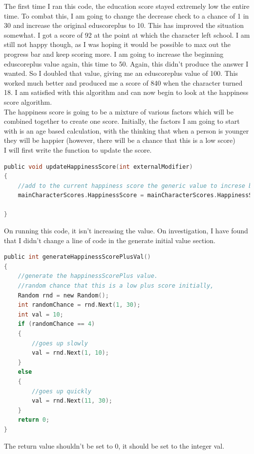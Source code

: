 The first time I ran this code, the education score stayed extremely low the entire time. To combat this, I am going to change the decrease check to a chance of 1 in 30 and increase the original eduscoreplus to 10.
This has improved the situation somewhat. I got a score of 92 at the point at which the character left school. I am still not happy though, as I was hoping it would be possible to max out the progress bar and keep scoring more. I am going to increase the beginning eduscoreplus value again, this time to 50.
Again, this didn't produce the answer I wanted. So I doubled that value, giving me an eduscoreplus value of 100. This worked much better and produced me a score of 840 when the character turned 18.
I am satisfied with this algorithm and can now begin to look at the happiness score algorithm.\\
The happiness score is going to be a mixture of various factors which will be combined together to create one score. Initially, the factors I am going to start with is an age based calculation, with the thinking that when a person is younger they will be happier (however, there will be a chance that this is a low score)\\
I will first write the function to update the score.
\begin{lstlisting}[language=c, style=csharp, caption=Happiness score calculation algorithm]
public void updateHappinessScore(int externalModifier)
{
    //add to the current happiness score the generic value to increse by plus a modifier
    mainCharacterScores.HappinessScore = mainCharacterScores.HappinessScore + controlClass.HappinessScorePlus + externalModifier;
    
}
\end{lstlisting}
On running this code, it isn't increasing the value. On investigation, I have found that I didn't change a line of code in the generate initial value section.
\begin{lstlisting}[language=c, style=csharp, caption=Generation of happiness score modifier algorithm]
public int generateHappinessScorePlusVal()
{
    //generate the happinessScorePlus value.
    //random chance that this is a low plus score initially, 
    Random rnd = new Random();
    int randomChance = rnd.Next(1, 30);
    int val = 10;
    if (randomChance == 4)
    {
        //goes up slowly
        val = rnd.Next(1, 10);
    }
    else
    {
        //goes up quickly
        val = rnd.Next(11, 30);
    }
    return 0;
}
\end{lstlisting}
The return value shouldn't be set to 0, it should be set to the integer val.\\
